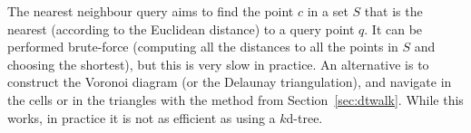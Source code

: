The nearest neighbour query%
aims to find the point $c$ in a set $S$ that is the nearest (according to the Euclidean distance) to a query point $q$.
It can be performed brute-force (computing all the distances to all the points in $S$ and choosing the shortest), but this is very slow in practice.
An alternative is to construct the Voronoi diagram (or the Delaunay triangulation), and navigate in the cells or in the triangles with the method from Section~\ref{sec:dtwalk}.
While this works, in practice it is not as efficient as using a $k$d-tree.


%

